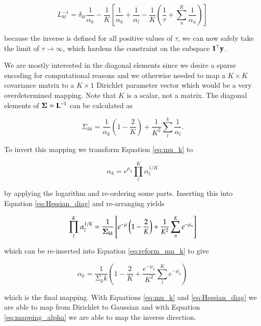 \begin{equation}
    L_{kl}^{-1} = \delta_{kl} \frac{1}{\alpha_k} - \frac{1}{K} \left[\frac{1}{\alpha_k} + \frac{1}{\alpha_l} - \frac{1}{K}\left( \frac{1}{\tau} + \sum_u^K \frac{1}{\alpha_u}\right) \right]
\end{equation}

because the inverse is defined for all positive values of $\tau$, we can now safely take the limit of $\tau \rightarrow \infty$, which hardens the constraint on the subspace $\mathbf{1}^\top {\mathbf{y}}$.

We are mostly interested in the diagonal elements since we desire a sparse encoding for computational reasons and we otherwise needed to map a $K \times K$ covariance matrix to a $K\times 1$ Dirichlet parameter vector which would be a very overdetermined mapping. Note that $K$ is a scalar, not a matrix. The diagonal elements of ${\boldsymbol{\Sigma}} = {\mathbf{L}}^{-1}$ can be calculated as

\begin{equation}
    \label{eq:Hessian_diag}
    \Sigma_{kk} = \frac{1}{\alpha_k} \left(1 - \frac{2}{K}\right)  + \frac{1}{K^2} \sum_{l}^{k} \frac{1}{\alpha_l}.
\end{equation}

To invert this mapping we transform Equation \ref{eq:mu_k} to 

\begin{equation}
    \label{eq:reform_mu_k}
    \alpha_k = e^{\mu_k} \prod_l^{K} \alpha_l^{1/K}
\end{equation}

by applying the logarithm and re-ordering some parts. Inserting this into Equation \ref{eq:Hessian_diag} and re-arranging yields

\begin{equation}
    \prod_l^K \alpha_l^{1/K} = \frac{1}{{\boldsymbol{\Sigma}}_{kk}} \left[e^{-\mu}\left(1 - \frac{2}{K}\right)  + \frac{1}{K^2} \sum_u^K e^{-\mu_u} \right]
\end{equation}

which can be re-inserted into Equation \ref{eq:reform_mu_k} to give

\begin{equation}
    \label{eq:mapping_alpha}
    \alpha_k = \frac{1}{\Sigma_kk} \left(1 - \frac{2}{K} + \frac{e^{-\mu_k}}{K^2} \sum_l^K e^{-\mu_k} \right)
\end{equation}

which is the final mapping. With Equations \ref{eq:mu_k} and \ref{eq:Hessian_diag} we are able to map from Dirichlet to Gaussian and with Equation \ref{eq:mapping_alpha} we are able to map the inverse direction. 



